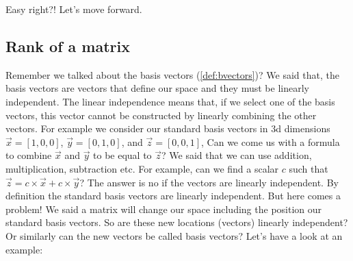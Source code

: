 \documentclass[
]{book}
\theoremstyle{definition}
\theoremstyle{definition}
\theoremstyle{definition}
\theoremstyle{remark}
\begin{document}
Easy right?! Let's move forward.

\hypertarget{rank-of-a-matrix}{%
\subsection{Rank of a matrix}\label{rank-of-a-matrix}}

Remember we talked about the basis vectors (\ref{def:bvectors})? We said that, the basis vectors are vectors that define our space and they must be linearly independent. The linear independence means that, if we select one of the basis vectors, this vector cannot be constructed by linearly combining the other vectors. For example we consider our standard basis vectors in 3d dimensions \(\vec{x}=[1,0,0]\), \(\vec{y}=[0,1,0]\), and \(\vec{z}=[0,0,1]\), Can we come us with a formula to combine \(\vec{x}\) and \(\vec{y}\) to be equal to \(\vec{z}\)? We said that we can use addition, multiplication, subtraction etc. For example, can we find a scalar \(c\) such that \(\vec{z}=c \times \vec{x} + c \times \vec{y}\)? The answer is no if the vectors are linearly independent. By definition the standard basis vectors are linearly independent. But here comes a problem! We said a matrix will change our space including the position our standard basis vectors. So are these new locations (vectors) linearly independent? Or similarly can the new vectors be called basis vectors? Let's have a look at an example:
\end{document}
